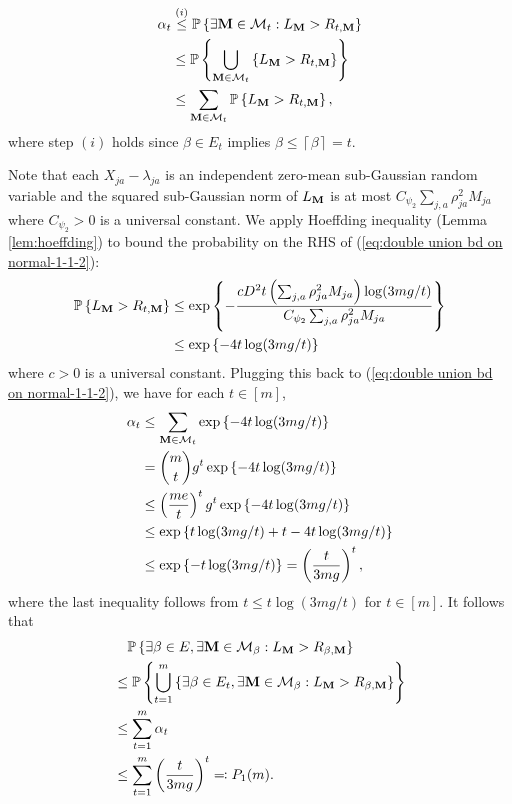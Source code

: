 \begin{align}
\alpha_{t} & \overset{(i)}{\le}\mathbb{P}\left\{ \exists\mathbf{M}\in\mathcal{M}_{t}:L_{\mathbf{M}}>R_{t,\mathbf{M}}\right\} \nonumber \\
 & \leq\mathbb{P}\left\{ \bigcup_{\mathbf{M}\in\mathcal{M}_{t}}\left\{ L_{\mathbf{M}}>R_{t,\mathbf{M}}\right\} \right\} \nonumber \\
 & \leq\sum_{\mathbf{M}\in\mathcal{M}_{t}}\mathbb{P}\left\{ L_{\mathbf{M}}>R_{t,\mathbf{M}}\right\} ,\label{eq:double union bd on normal-1-1-2}
\end{align}
where step $(i)$ holds since $\beta\in E_{t}$ implies $\beta\le\left\lceil \beta\right\rceil =t$. 

Note that each $X_{ja}-\lambda_{ja}$ is an independent zero-mean
sub-Gaussian random variable and the squared sub-Gaussian norm of
$L_{\mathbf{M}}$ is at most $C_{\psi_{2}}\sum_{j,a}\rho_{ja}^{2}M_{ja}$
where $C_{\psi_{2}}>0$ is a universal constant. We apply Hoeffding
inequality (Lemma \ref{lem:hoeffding}) to bound the probability on
the RHS of (\ref{eq:double union bd on normal-1-1-2}): 
\begin{align*}
\mathbb{P}\left\{ L_{\mathbf{M}}>R_{t,\mathbf{M}}\right\}  & \leq\exp\left\{ -\frac{cD^{2}t\left(\sum_{j,a}\rho_{ja}^{2}M_{ja}\right)\log(3mg/t)}{C_{\psi_{2}}\sum_{j,a}\rho_{ja}^{2}M_{ja}}\right\} \\
 & \leq\exp\left\{ -4t\log(3mg/t)\right\} 
\end{align*}
where $c>0$ is a universal constant. Plugging this back to (\ref{eq:double union bd on normal-1-1-2}),
we have for each $t\in\left[m\right]$, 
\begin{align}
\alpha_{t} & \leq\sum_{\mathbf{M}\in\mathcal{M}_{t}}\exp\left\{ -4t\log(3mg/t)\right\} \nonumber \\
 & =\binom{m}{t}g^{t}\exp\left\{ -4t\log(3mg/t)\right\} \nonumber \\
 & \leq\left(\frac{me}{t}\right)^{t}g^{t}\exp\left\{ -4t\log(3mg/t)\right\} \nonumber \\
 & \leq\exp\left\{ t\log(3mg/t)+t-4t\log(3mg/t)\right\} \nonumber \\
 & \leq\exp\left\{ -t\log(3mg/t)\right\} =\left(\frac{t}{3mg}\right)^{t},\label{eq:binom coeff bound-1-2}
\end{align}
where the last inequality follows from $t\leq t\log(3mg/t)$ for $t\in\left[m\right]$.
It follows that 
\begin{align*}
 & \quad\mathbb{P}\left\{ \exists\beta\in E,\exists\mathbf{M}\in\mathcal{M}_{\beta}:L_{\mathbf{M}}>R_{\beta,\mathbf{M}}\right\} \\
 & \leq\mathbb{P}\left\{ \bigcup_{t=1}^{m}\left\{ \exists\beta\in E_{t},\exists\mathbf{M}\in\mathcal{M}_{\beta}:L_{\mathbf{M}}>R_{\beta,\mathbf{M}}\right\} \right\} \\
 & \le\sum_{t=1}^{m}\alpha_{t}\\
 & \leq\sum_{t=1}^{m}\left(\frac{t}{3mg}\right)^{t}\eqqcolon P_{1}(m).
\end{align*}

